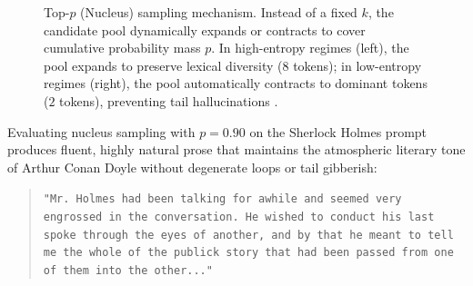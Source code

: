 \documentclass[../../main.tex]{subfiles}
\begin{document}
\begin{figure}[htbp]
{%
}
\caption{Top-$p$ (Nucleus) sampling mechanism. Instead of a fixed $k$, the candidate pool dynamically expands or contracts to cover cumulative probability mass $p$. In high-entropy regimes (left), the pool expands to preserve lexical diversity ($8$ tokens); in low-entropy regimes (right), the pool automatically contracts to dominant tokens ($2$ tokens), preventing tail hallucinations \cite{holtzman2020}.}
\label{fig:top_p_sampling}
\end{figure}

Evaluating nucleus sampling with $p=0.90$ on the Sherlock Holmes prompt produces fluent, highly natural prose that maintains the atmospheric literary tone of Arthur Conan Doyle without degenerate loops or tail gibberish:
\begin{quote}
\texttt{"Mr. Holmes had been talking for awhile and seemed very engrossed in the conversation. He wished to conduct his last spoke through the eyes of another, and by that he meant to tell me the whole of the publick story that had been passed from one of them into the other..."}
\end{quote}
\end{document}
